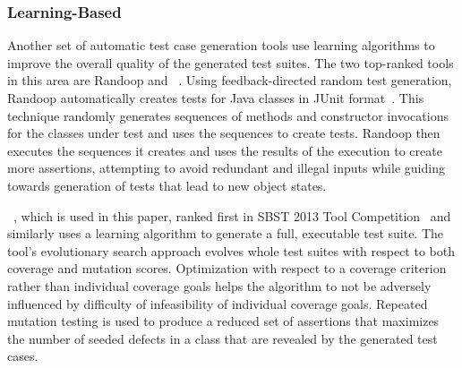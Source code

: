 \subsubsection{Learning-Based}

Another set of automatic test case generation tools use learning algorithms to improve the overall quality of the generated test suites.  The two top-ranked tools in this area are Randoop and \evo~\cite{fraser2013a}.  Using feedback-directed random test generation, Randoop automatically creates tests for Java classes in JUnit format~\cite{pacheco2007feedback}. This technique randomly generates sequences of methods and constructor invocations for the classes under test and uses the sequences to create tests. Randoop then executes the sequences it creates and uses the results of the execution to create more assertions, attempting to  avoid redundant and illegal inputs while guiding towards generation of tests that lead to new object states. 

\evo~\cite{fraser:2011:eat:2025113.2025179}, which is used in this paper, ranked first in SBST 2013 Tool Competition~\cite{fraser2013a} and similarly uses a learning algorithm to generate a full, executable test suite.  The tool's evolutionary search approach evolves whole test suites with respect to both coverage and mutation scores.  Optimization with respect to a coverage criterion rather than individual coverage goals helps the algorithm to not be adversely influenced by difficulty of infeasibility of individual coverage goals.  Repeated mutation testing is used to produce a reduced set of assertions that maximizes the number of seeded defects in a class that are revealed by the generated test cases.

